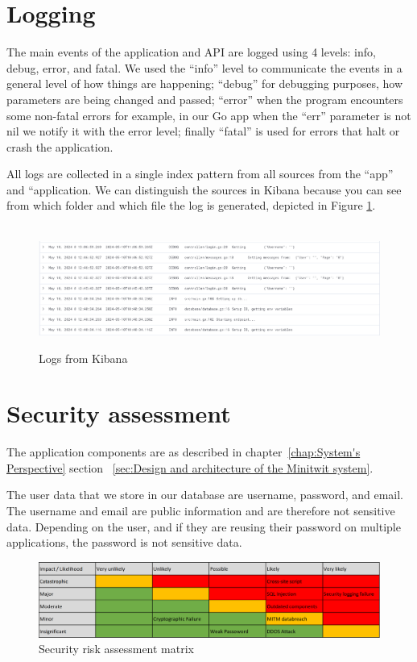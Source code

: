 \documentclass[12pt, a4paper, oneside]{book}
\begin{document}
\section{Logging}
\label{sec:Logging}
The main events of the application and API are logged using 4 levels: info, debug, error, and fatal. We used the “info” level to communicate the events in a general level of how things are happening; “debug” for debugging purposes, how parameters are being changed and passed; “error” when the program encounters some non-fatal errors for example, in our Go app when the “err” parameter is not nil we notify it with the error level; finally “fatal” is used for errors that halt or crash the application. \bigskip

All logs are collected in a single index pattern from all sources from the “app” and “application.
We can distinguish the sources in Kibana because you can see from which folder and which file the log is generated, depicted in Figure \ref{fig:kabana-logs}.
\begin{figure}[H]
    \centering
    \hbox{\hspace{-5em}
    \includegraphics[scale = 0.6]{images/kibana.png}}
    \caption{Logs from Kibana}
    \label{fig:kabana-logs}
\end{figure}

\section{Security assessment}
The application components are as described in chapter~\ref{chap:System's Perspective} section 
~\ref{sec:Design and architecture of the Minitwit system}. 

The user data that we store in our database are username, password, and email.
The username and email are public information and are therefore not sensitive data.
Depending on the user, and if they are reusing their password on multiple applications, the password is not sensitive data.

\begin{figure}[H]
    \centering
    \includegraphics[width=1.0\textwidth]{images/SecRiskAssMatrix.PNG}
    \caption{Security risk assessment matrix\cite{owasp2024}\cite{comparitech2024}}
    \label{fig:security matrix}
\end{figure}
\end{document}
